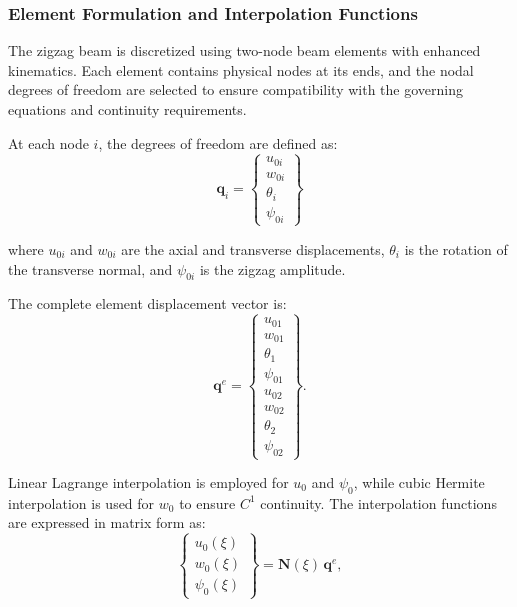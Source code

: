 \documentclass[12pt,a4paper]{report}
\begin{document}
\subsubsection*{Element Formulation and Interpolation Functions}

The zigzag beam is discretized using two-node beam elements with enhanced kinematics. Each element contains physical nodes at its ends, and the nodal degrees of freedom are selected to ensure compatibility with the governing equations and continuity requirements.

At each node $i$, the degrees of freedom are defined as:
\begin{equation}
    \mathbf{q}_i = \begin{Bmatrix} u_{0i} \\ w_{0i} \\ \theta_i \\ \psi_{0i} \end{Bmatrix}
\end{equation}

where $u_{0i}$ and $w_{0i}$ are the axial and transverse displacements, $\theta_i$ is the rotation of the transverse normal, and $\psi_{0i}$ is the zigzag amplitude.

The complete element displacement vector is:
\begin{equation}
    \mathbf{q}^e = \begin{Bmatrix} u_{01} \\ w_{01} \\ \theta_1 \\ \psi_{01} \\ u_{02} \\ w_{02} \\ \theta_2 \\ \psi_{02} \end{Bmatrix}.
\end{equation}


Linear Lagrange interpolation is employed for $u_0$ and $\psi_0$, while cubic Hermite interpolation is used for $w_0$ to ensure $C^1$ continuity. The interpolation functions are expressed in matrix form as:
\begin{equation}
   \begin{Bmatrix} u_0(\xi) \\ w_0(\xi) \\ \psi_0(\xi) \end{Bmatrix} 
= \mathbf{N}(\xi) \, \mathbf{q}^e,
\end{equation}
\end{document}
